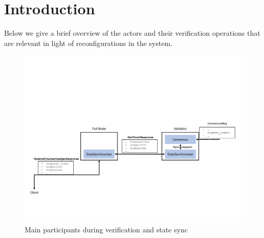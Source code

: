 \documentclass[letterpaper,10pt]{article}
\begin{document}
\section{Introduction}
\label{intro}
Below we give a brief overview of the actors and their verification operations that are relevant in light of reconfigurations in the system.

\begin{figure}[ht]
	\centering
	\includegraphics[width=\textwidth]{figures/verification-actors.pdf}
	\caption{\footnotesize{Main participants during verification and state sync}}
	\label{fig:verification-actors}
\end{figure}
\end{document}
